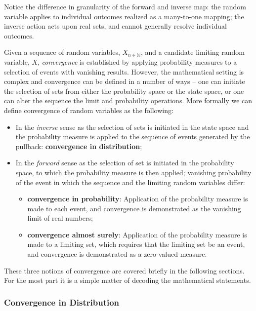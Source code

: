 \documentclass[12pt, twoside, draft]{article}
\begin{document}
Notice the difference in granularity of the forward and inverse map: the random variable applies to individual outcomes realized as a many-to-one mapping; the inverse action acts upon real sets, and cannot generally resolve individual outcomes.  

Given a sequence of random variables, $X_{n \in \mathbb{N}}$, and a candidate limiting random variable, $X$, \textit{convergence} is established by applying probability measures to a selection of events with vanishing results.  However, the mathematical setting is complex and convergence can be defined in a number of ways -- one can initiate the selection of sets from either the probability space or the state space, or one can alter the sequence the limit and probability operations.  More formally we can define convergence of random variables as the following:

\begin{itemize}
\item In the \textit{inverse} sense as the selection of sets is initiated in the state space and the probability measure is applied to the sequence of events generated by the pullback:  \textbf{convergence in distribution};
\item In the \textit{forward} sense as the selection of set is initiated in the probability space, to which the probability measure is then applied;
 vanishing probability of the event in which the sequence and the limiting random variables differ:
\begin{itemize}[noitemsep]
\item \textbf{convergence in probability}: Application of the probability measure is made to each event, and convergence is demonstrated as the vanishing limit of real numbers;
\item \textbf{convergence almost surely}: Application of the probability measure is made to a limiting set, which requires that the limiting set be an event, and convergence is demonstrated as a zero-valued measure.
\end{itemize}
\end{itemize}

These three notions of convergence are covered briefly in the following sections.  For the most part it is a simple matter of decoding the mathematical statements.

\subsubsection{Convergence in Distribution}\label{sec:convergence_in_distribution}
\end{document}
